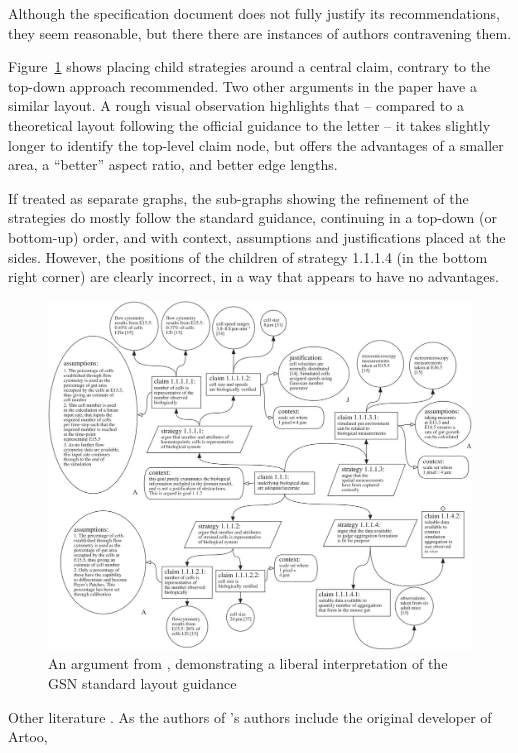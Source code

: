 Although the specification document does not fully justify its recommendations, they seem reasonable, but there there are instances of authors contravening them.

Figure~\ref{fig:aldencentral} shows \citet{royal} placing child strategies around a central claim, contrary to the top-down approach recommended. Two other arguments in the paper \cite[pp.~8--9]{royal} have a similar layout.
A rough visual observation highlights that -- compared to a theoretical layout following the official guidance to the letter -- it takes slightly longer to identify the top-level claim node, but offers the advantages of a smaller area, a ``better'' aspect ratio, and better edge lengths. 

If treated as separate graphs, the sub-graphs showing the refinement of the strategies do mostly follow the standard guidance, continuing in a top-down (or bottom-up) order, and with context, assumptions and justifications placed at the sides. However, the positions of the children of strategy 1.1.1.4 (in the bottom right corner) are clearly incorrect, in a way that appears to have no advantages.

\begin{figure}
    \includegraphics[width=\textwidth]{graphics/aldencentral.jpg}
    \caption{An argument from \cite{royal}, demonstrating a liberal interpretation of the GSN standard layout guidance}
    \label{fig:aldencentral}
\end{figure}

Other literature  . As the authors of \cite{royal}'s authors include the original developer of Artoo, 

